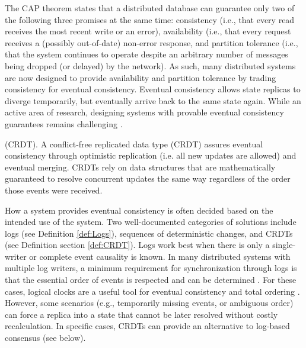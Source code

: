 \documentclass{textile}
\begin{document}
The CAP theorem \cite{brewerRobustDistributedSystems2000,gilbertBrewerConjectureFeasibility2002a} states that a distributed database can guarantee only two of the following three promises at the same time: consistency (i.e., that every read receives the most recent write or an error), availability (i.e., that every request receives a (possibly out-of-date) non-error response, and partition tolerance (i.e., that the system continues to operate despite an arbitrary number of messages being dropped (or delayed) by the network). As such, many distributed systems are now designed to provide availability and partition tolerance by trading consistency for eventual consistency. Eventual consistency allows state replicas to diverge temporarily, but eventually arrive back to the same state again. While an active area of research, designing systems with provable eventual consistency guarantees remains challenging \cite{shapiroComprehensiveStudyConvergent2011a,almeidaDeltaStateReplicated2018}.


\begin{definition} (CRDT). A conflict-free replicated data type (CRDT) assures eventual consistency through optimistic replication (i.e. all new updates are allowed) and eventual merging. CRDTs rely on data structures that are mathematically guaranteed to resolve concurrent updates the same way regardless of the order those events were received. \end{definition} \label{def:CRDT}

How a system provides eventual consistency is often decided based on the intended use of the system. Two well-documented categories of solutions include logs (see Definition  \ref{def:Logs}), sequences of deterministic changes, and CRDTs (see Definition section  \ref{def:CRDT}). Logs work best when there is only a single-writer or complete event causality is known. In many distributed systems with multiple log writers, a minimum requirement for synchronization through logs is that the essential order of events is respected and can be determined \cite{schwarzDetectingCausalRelationships1994,katzInterleavingSetTemporal1990}. For these cases, logical clocks are a useful tool for eventual consistency and total ordering \cite{kulkarniLogicalPhysicalClocks2014}. However, some scenarios (e.g., temporarily missing events, or ambiguous order) can force a replica into a state that cannot be later resolved without costly recalculation. In specific cases, CRDTs can provide an alternative to log-based consensus (see below). 
\end{document}
